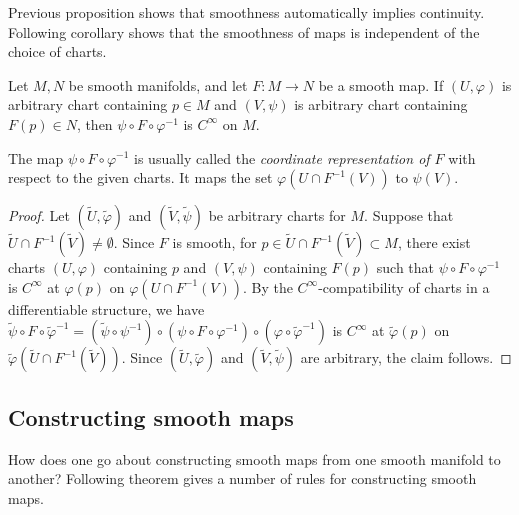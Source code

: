Previous proposition shows that smoothness automatically implies continuity. Following corollary shows that the smoothness of maps is independent of the choice of charts.

\begin{corollary}\label{lem:smoothness is independent of chars}
    Let $M, N$ be smooth manifolds, and let $F : M \to N$ be a smooth map. If $(U, \varphi)$ is arbitrary chart containing $p \in M$ and $(V, \psi)$ is arbitrary chart containing $F(p) \in N$, then $\psi\circ F \circ \varphi^{-1}$ is $C^\infty$ on $M$.
\end{corollary}

\begin{remark}
    The map $\psi\circ F \circ \varphi^{-1}$ is usually called the \emph{coordinate representation of $F$} with respect to the given charts. It maps the set $\varphi(U \cap F^{-1}(V))$ to $\psi(V)$.
\end{remark}

\begin{proof}
    Let $(\widetilde{U}, \widetilde{\varphi})$ and $(\widetilde{V}, \widetilde{\psi})$ be arbitrary charts for $M$. Suppose that $\widetilde{U} \cap F^{-1}(\widetilde{V}) \neq \emptyset$. Since $F$ is smooth, for $p \in \widetilde{U} \cap F^{-1}(\widetilde{V}) \subset M$, there exist charts $(U, \varphi)$ containing $p$ and $(V, \psi)$ containing $F(p)$ such that $\psi \circ F \circ \varphi^{-1}$ is $C^\infty$ at $\varphi(p)$ on $\varphi(U \cap F^{-1}(V))$. By the $C^\infty$-compatibility of charts in a differentiable structure, we have $\widetilde{\psi} \circ F \circ \widetilde{\varphi}^{-1} = (\widetilde{\psi} \circ \psi^{-1}) \circ (\psi \circ F \circ \varphi^{-1}) \circ (\varphi \circ \widetilde{\varphi}^{-1})$ is $C^\infty$ at $\widetilde{\varphi}(p)$ on $\widetilde{\varphi}(\widetilde{U} \cap F^{-1}(\widetilde{V}))$. Since $(\widetilde{U}, \widetilde{\varphi})$ and $(\widetilde{V}, \widetilde{\psi})$ are arbitrary, the claim follows.
\end{proof}

\subsection{Constructing smooth maps}

How does one go about constructing smooth maps from one smooth manifold to another? Following theorem gives a number of rules for constructing smooth maps.

